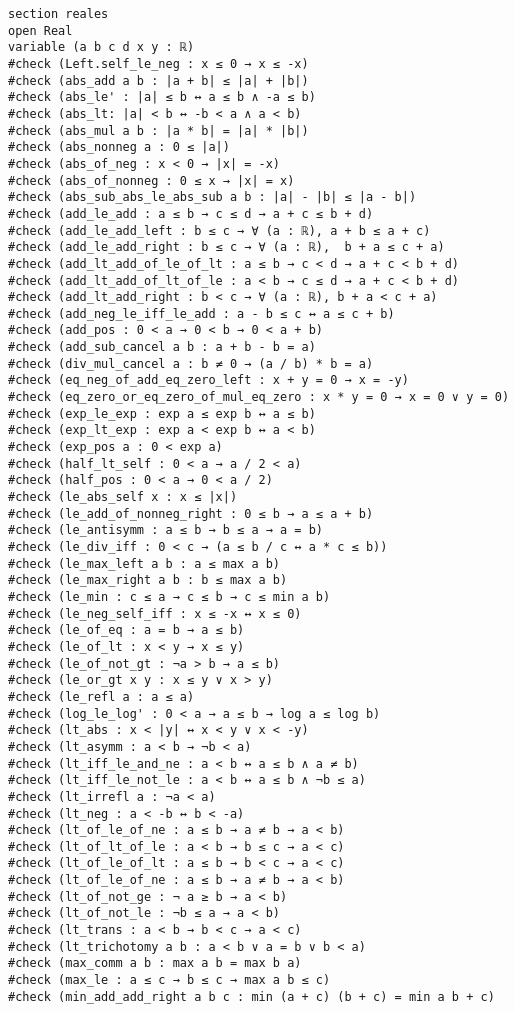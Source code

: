 \begin{verbatim}
section reales
open Real
variable (a b c d x y : ℝ)
#check (Left.self_le_neg : x ≤ 0 → x ≤ -x)
#check (abs_add a b : |a + b| ≤ |a| + |b|)
#check (abs_le' : |a| ≤ b ↔ a ≤ b ∧ -a ≤ b)
#check (abs_lt: |a| < b ↔ -b < a ∧ a < b)
#check (abs_mul a b : |a * b| = |a| * |b|)
#check (abs_nonneg a : 0 ≤ |a|)
#check (abs_of_neg : x < 0 → |x| = -x)
#check (abs_of_nonneg : 0 ≤ x → |x| = x)
#check (abs_sub_abs_le_abs_sub a b : |a| - |b| ≤ |a - b|)
#check (add_le_add : a ≤ b → c ≤ d → a + c ≤ b + d)
#check (add_le_add_left : b ≤ c → ∀ (a : ℝ), a + b ≤ a + c)
#check (add_le_add_right : b ≤ c → ∀ (a : ℝ),  b + a ≤ c + a)
#check (add_lt_add_of_le_of_lt : a ≤ b → c < d → a + c < b + d)
#check (add_lt_add_of_lt_of_le : a < b → c ≤ d → a + c < b + d)
#check (add_lt_add_right : b < c → ∀ (a : ℝ), b + a < c + a)
#check (add_neg_le_iff_le_add : a - b ≤ c ↔ a ≤ c + b)
#check (add_pos : 0 < a → 0 < b → 0 < a + b)
#check (add_sub_cancel a b : a + b - b = a)
#check (div_mul_cancel a : b ≠ 0 → (a / b) * b = a)
#check (eq_neg_of_add_eq_zero_left : x + y = 0 → x = -y)
#check (eq_zero_or_eq_zero_of_mul_eq_zero : x * y = 0 → x = 0 ∨ y = 0)
#check (exp_le_exp : exp a ≤ exp b ↔ a ≤ b)
#check (exp_lt_exp : exp a < exp b ↔ a < b)
#check (exp_pos a : 0 < exp a)
#check (half_lt_self : 0 < a → a / 2 < a)
#check (half_pos : 0 < a → 0 < a / 2)
#check (le_abs_self x : x ≤ |x|)
#check (le_add_of_nonneg_right : 0 ≤ b → a ≤ a + b)
#check (le_antisymm : a ≤ b → b ≤ a → a = b)
#check (le_div_iff : 0 < c → (a ≤ b / c ↔ a * c ≤ b))
#check (le_max_left a b : a ≤ max a b)
#check (le_max_right a b : b ≤ max a b)
#check (le_min : c ≤ a → c ≤ b → c ≤ min a b)
#check (le_neg_self_iff : x ≤ -x ↔ x ≤ 0)
#check (le_of_eq : a = b → a ≤ b)
#check (le_of_lt : x < y → x ≤ y)
#check (le_of_not_gt : ¬a > b → a ≤ b)
#check (le_or_gt x y : x ≤ y ∨ x > y)
#check (le_refl a : a ≤ a)
#check (log_le_log' : 0 < a → a ≤ b → log a ≤ log b)
#check (lt_abs : x < |y| ↔ x < y ∨ x < -y)
#check (lt_asymm : a < b → ¬b < a)
#check (lt_iff_le_and_ne : a < b ↔ a ≤ b ∧ a ≠ b)
#check (lt_iff_le_not_le : a < b ↔ a ≤ b ∧ ¬b ≤ a)
#check (lt_irrefl a : ¬a < a)
#check (lt_neg : a < -b ↔ b < -a)
#check (lt_of_le_of_ne : a ≤ b → a ≠ b → a < b)
#check (lt_of_lt_of_le : a < b → b ≤ c → a < c)
#check (lt_of_le_of_lt : a ≤ b → b < c → a < c)
#check (lt_of_le_of_ne : a ≤ b → a ≠ b → a < b)
#check (lt_of_not_ge : ¬ a ≥ b → a < b)
#check (lt_of_not_le : ¬b ≤ a → a < b)
#check (lt_trans : a < b → b < c → a < c)
#check (lt_trichotomy a b : a < b ∨ a = b ∨ b < a)
#check (max_comm a b : max a b = max b a)
#check (max_le : a ≤ c → b ≤ c → max a b ≤ c)
#check (min_add_add_right a b c : min (a + c) (b + c) = min a b + c)

\end{verbatim}
